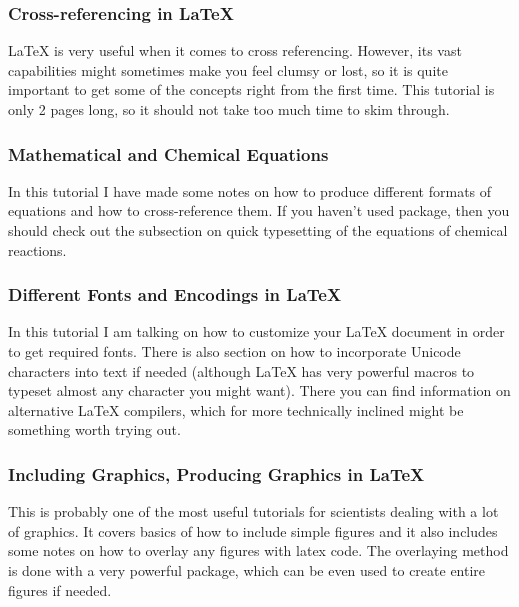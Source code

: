 \documentclass[
    draft
    ]{scrartcl}
\begin{document}
%
\subsubsection{Cross-referencing in \LaTeX{}}

%
\LaTeX{} is very useful when it comes to cross referencing.
%
However, its vast capabilities might sometimes make you feel clumsy or lost, so
    it is quite important to get some of the concepts right from the first time.
%
This tutorial is only 2 pages long, so it should not take too much time to skim
    through.

%
\subsubsection{Mathematical and Chemical Equations}

%
In this tutorial I have made some notes on how to produce different formats of
    equations and how to cross-reference them.
%
If you haven't used  package, then you should check out the
    subsection on quick typesetting of the equations of chemical reactions.
    
%
\subsubsection{Different Fonts and Encodings in \LaTeX{}}

%
In this tutorial I am talking on how to customize your \LaTeX{} document in
    order to get required fonts.
%
There is also section on how to incorporate Unicode characters into text if
    needed (although \LaTeX{} has very powerful macros to typeset almost any
    character you might want).
%
There you can find information on alternative \LaTeX{} compilers, which for more
    technically inclined might be something worth trying out.

%
\subsubsection{Including Graphics, Producing Graphics in \LaTeX{}}

%
This is probably one of the most useful tutorials for scientists dealing with a
    lot of graphics.
%
It covers basics of how to include simple figures and it also includes some
    notes on how to overlay any figures with latex code.
%
The overlaying method is done with a very powerful  package, which can
    be even used to create entire figures if needed.
    
\end{document}
